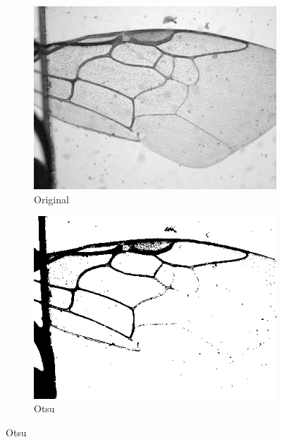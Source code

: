 \documentclass[a4paper]{article}
\begin{document}
\begin{figure}[H]
\centering
\begin{subfigure}{.35\textwidth}
  \centering
    \includegraphics[width=\linewidth]{figures/original.png}
    \caption{Original}
\end{subfigure}
\begin{subfigure}{.35\textwidth}
  \centering
  \includegraphics[width=\linewidth]{figures/otsu.png}
  \caption{Otsu}
\end{subfigure}


\end{figure}
\end{document}
